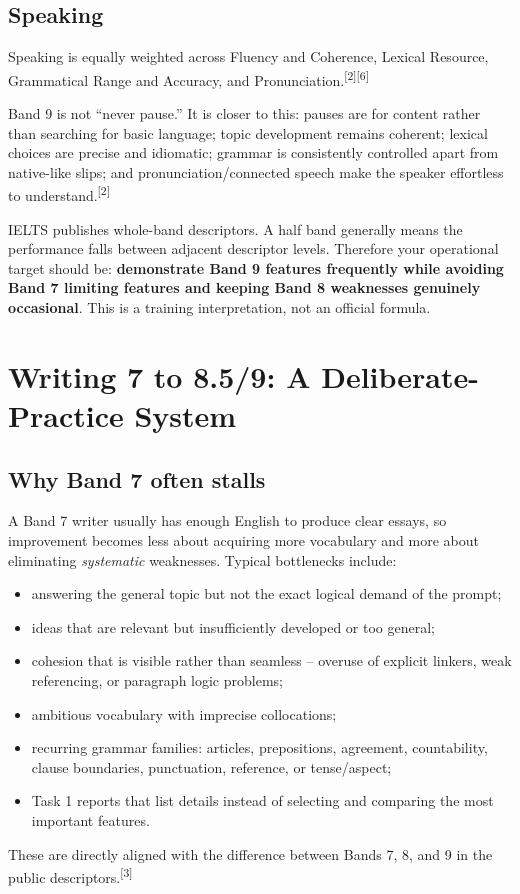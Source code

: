 \documentclass[11pt,a4paper]{article}
\newcommand{\src}[1]{\textsuperscript{[#1]}}
\begin{document}
\subsection{Speaking}
Speaking is equally weighted across Fluency and Coherence, Lexical Resource, Grammatical Range and Accuracy, and Pronunciation.\src{2}\src{6}

Band 9 is not ``never pause.'' It is closer to this: pauses are for content rather than searching for basic language; topic development remains coherent; lexical choices are precise and idiomatic; grammar is consistently controlled apart from native-like slips; and pronunciation/connected speech make the speaker effortless to understand.\src{2}

\begin{keybox}
IELTS publishes whole-band descriptors. A half band generally means the performance falls between adjacent descriptor levels. Therefore your operational target should be: \textbf{demonstrate Band 9 features frequently while avoiding Band 7 limiting features and keeping Band 8 weaknesses genuinely occasional}. This is a training interpretation, not an official formula.
\end{keybox}

\section{Writing 7 to 8.5/9: A Deliberate-Practice System}

\subsection{Why Band 7 often stalls}
A Band 7 writer usually has enough English to produce clear essays, so improvement becomes less about acquiring more vocabulary and more about eliminating \emph{systematic} weaknesses. Typical bottlenecks include:
\begin{itemize}
\item answering the general topic but not the exact logical demand of the prompt;
\item ideas that are relevant but insufficiently developed or too general;
\item cohesion that is visible rather than seamless -- overuse of explicit linkers, weak referencing, or paragraph logic problems;
\item ambitious vocabulary with imprecise collocations;
\item recurring grammar families: articles, prepositions, agreement, countability, clause boundaries, punctuation, reference, or tense/aspect;
\item Task 1 reports that list details instead of selecting and comparing the most important features.
\end{itemize}
These are directly aligned with the difference between Bands 7, 8, and 9 in the public descriptors.\src{3}
\end{document}
